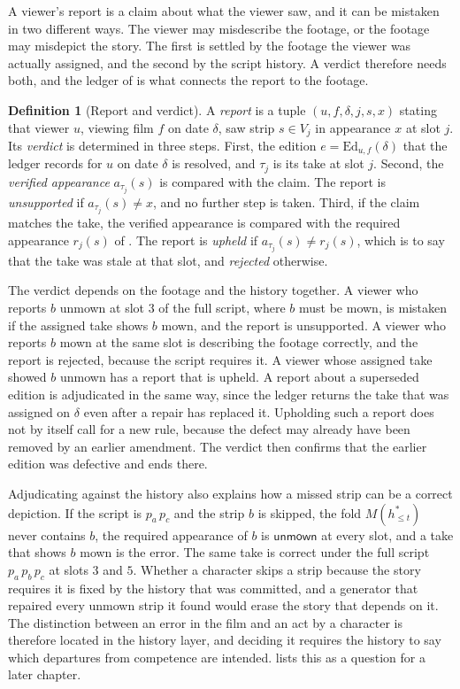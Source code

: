 \documentclass[11pt,twoside,openright]{book}
\theoremstyle{plain}
\theoremstyle{definition}
\newtheorem{definition}[theorem]{Definition}
\theoremstyle{remark}
\newcommand{\unmown}{\mathsf{unmown}}
\begin{document}
A viewer's report is a claim about what the viewer saw, and it can be mistaken in two different ways. The viewer may misdescribe the footage, or the footage may misdepict the story. The first is settled by the footage the viewer was actually assigned, and the second by the script history. A verdict therefore needs both, and the ledger of  is what connects the report to the footage.

\begin{definition}[Report and verdict]\label{def:verdict}
A \emph{report} is a tuple $(u,f,\delta,j,s,x)$ stating that viewer $u$, viewing film $f$ on date $\delta$, saw strip $s\in V_j$ in appearance $x$ at slot $j$. Its \emph{verdict} is determined in three steps. First, the edition $e=\mathrm{Ed}_{u,f}(\delta)$ that the ledger records for $u$ on date $\delta$ is resolved, and $\tau_j$ is its take at slot $j$. Second, the \emph{verified appearance} $a_{\tau_j}(s)$ is compared with the claim. The report is \emph{unsupported} if $a_{\tau_j}(s)\ne x$, and no further step is taken. Third, if the claim matches the take, the verified appearance is compared with the required appearance $r_j(s)$ of . The report is \emph{upheld} if $a_{\tau_j}(s)\ne r_j(s)$, which is to say that the take was stale at that slot, and \emph{rejected} otherwise.
\end{definition}

The verdict depends on the footage and the history together. A viewer who reports $b$ unmown at slot $3$ of the full script, where $b$ must be mown, is mistaken if the assigned take shows $b$ mown, and the report is unsupported. A viewer who reports $b$ mown at the same slot is describing the footage correctly, and the report is rejected, because the script requires it. A viewer whose assigned take showed $b$ unmown has a report that is upheld. A report about a superseded edition is adjudicated in the same way, since the ledger returns the take that was assigned on $\delta$ even after a repair has replaced it. Upholding such a report does not by itself call for a new rule, because the defect may already have been removed by an earlier amendment. The verdict then confirms that the earlier edition was defective and ends there.

Adjudicating against the history also explains how a missed strip can be a correct depiction. If the script is $p_a\,p_c$ and the strip $b$ is skipped, the fold $M(h^\ast_{\le t})$ never contains $b$, the required appearance of $b$ is $\unmown$ at every slot, and a take that shows $b$ mown is the error. The same take is correct under the full script $p_a\,p_b\,p_c$ at slots $3$ and $5$. Whether a character skips a strip because the story requires it is fixed by the history that was committed, and a generator that repaired every unmown strip it found would erase the story that depends on it. The distinction between an error in the film and an act by a character is therefore located in the history layer, and deciding it requires the history to say which departures from competence are intended.  lists this as a question for a later chapter.
\end{document}
